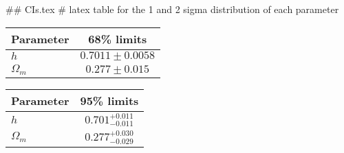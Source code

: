 ## CIs.tex
# latex table for the 1 and 2 sigma distribution of each parameter

\begin{tabular} { l  c}
 Parameter &  68\% limits\\
\hline
{\boldmath$h              $} & $0.7011\pm 0.0058          $\\
{\boldmath$\Omega_m       $} & $0.277\pm 0.015            $\\
\hline
\end{tabular}

\begin{tabular} { l  c}
 Parameter &  95\% limits\\
\hline
{\boldmath$h              $} & $0.701^{+0.011}_{-0.011}   $\\
{\boldmath$\Omega_m       $} & $0.277^{+0.030}_{-0.029}   $\\
\hline
\end{tabular}
